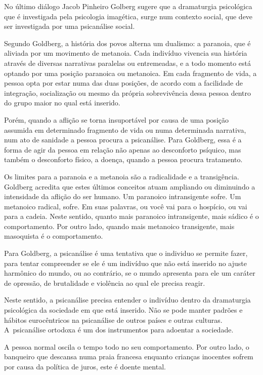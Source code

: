  

No último diálogo Jacob Pinheiro Golberg sugere que a dramaturgia
psicológica que é investigada pela psicologia imagética, surge num
contexto social, que deve ser investigada por uma psicanálise social.

Segundo Goldberg, a história dos povos alterna um dualismo: a paranoia,
que é aliviada por um movimento de metanoia. Cada indivíduo vivencia sua
história através de diversas narrativas paralelas ou entremeadas, e a
todo momento está optando por uma posição paranoica ou metanoica. Em
cada fragmento de vida, a pessoa opta por estar numa das duas posições,
de acordo com a facilidade de integração, socialização ou mesmo da
própria sobrevivência dessa pessoa dentro do grupo maior no qual está
inserido.

Porém, quando a aflição se torna insuportável por causa de uma posição
assumida em determinado fragmento de vida ou numa determinada narrativa,
num ato de sanidade a pessoa procura a psicanálise. Para Goldberg, essa
é a forma de agir da pessoa em relação não apenas ao desconforto
psíquico, mas também o desconforto físico, a doença, quando a pessoa
procura tratamento.

Os limites para a paranoia e a metanoia são a radicalidade e a
transigência. Goldberg acredita que estes últimos conceitos atuam
ampliando ou diminuindo a intensidade da aflição do ser humano. Um
paranoico intransigente sofre. Um metanoico radical, sofre. Em suas
palavras, ou você vai para o hospício, ou vai para a cadeia. Neste
sentido, quanto mais paranoico intransigente, mais sádico é o
comportamento. Por outro lado, quando mais metanoico transigente, mais
masoquista é o comportamento.

Para Goldberg, a psicanálise é uma tentativa que o individuo se permite
fazer, para tentar compreender se ele é um indivíduo que não está
inserido no ajuste harmônico do mundo, ou ao contrário, se o mundo
apresenta para ele um caráter de opressão, de brutalidade e violência ao
qual ele precisa reagir.

Neste sentido, a psicanálise precisa entender o indivíduo dentro da
dramaturgia psicológica da sociedade em que está inserido. Não se pode
manter padrões e hábitos eurocêntricos na psicanálise de outros países e
outras culturas. A~psicanálise ortodoxa é um dos instrumentos para
adoentar a sociedade.

A pessoa normal oscila o tempo todo no seu comportamento. Por outro
lado, o banqueiro que descansa numa praia francesa enquanto crianças
inocentes sofrem por causa da política de juros, este é doente mental.

